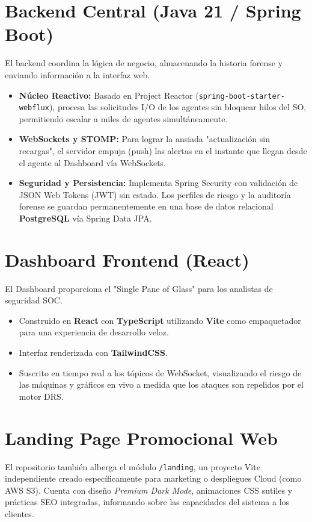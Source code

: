 \documentclass[12pt,a4paper]{article}
\begin{document}
\section{Backend Central (Java 21 / Spring Boot)}
El backend coordina la lógica de negocio, almacenando la historia forense y enviando información a la interfaz web.
\begin{itemize}
    \item \textbf{Núcleo Reactivo:} Basado en Project Reactor (\texttt{spring-boot-starter-webflux}), procesa las solicitudes I/O de los agentes sin bloquear hilos del SO, permitiendo escalar a miles de agentes simultáneamente.
    \item \textbf{WebSockets y STOMP:} Para lograr la ansiada "actualización sin recargas", el servidor empuja (push) las alertas en el instante que llegan desde el agente al Dashboard vía WebSockets.
    \item \textbf{Seguridad y Persistencia:} Implementa Spring Security con validación de JSON Web Tokens (JWT) sin estado. Los perfiles de riesgo y la auditoría forense se guardan permanentemente en una base de datos relacional \textbf{PostgreSQL} vía Spring Data JPA.
\end{itemize}

\section{Dashboard Frontend (React)}
El Dashboard proporciona el "Single Pane of Glass" para los analistas de seguridad SOC.
\begin{itemize}
    \item Construido en \textbf{React} con \textbf{TypeScript} utilizando \textbf{Vite} como empaquetador para una experiencia de desarrollo veloz.
    \item Interfaz renderizada con \textbf{TailwindCSS}.
    \item Suscrito en tiempo real a los tópicos de WebSocket, visualizando el riesgo de las máquinas y gráficos en vivo a medida que los ataques son repelidos por el motor DRS.
\end{itemize}

\section{Landing Page Promocional Web}
El repositorio también alberga el módulo \texttt{/landing}, un proyecto Vite independiente creado específicamente para marketing o despliegues Cloud (como AWS S3). Cuenta con diseño \textit{Premium Dark Mode}, animaciones CSS sutiles y prácticas SEO integradas, informando sobre las capacidades del sistema a los clientes.
\end{document}
